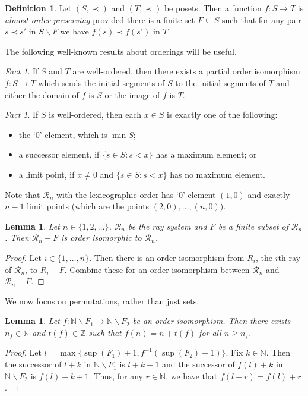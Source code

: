 \documentclass[11pt,a4paper]{amsart}
\renewcommand{\setminus}{\smallsetminus}
\newtheorem{lemma}[theorem]{Lemma}
\theoremstyle{definition}
\newtheorem{definition}[theorem]{Definition}
\theoremstyle{remark}
\newtheorem{fact}[theorem]{Fact}
\newcommand{\Z}{\mathbb Z}
\newcommand{\N}{\mathbb N}
\newcommand{\Ra}{\mathcal{R}}
\begin{document}
\begin{definition}
	Let $(S,\prec)$ and $(T,\prec)$ be posets. Then a function $f:S\to T$ is \emph{almost order preserving} provided there is a finite set $F\subseteq S$ such that for any pair $s\prec s'$ in $S\setminus F$ we have $f(s)\prec f(s')$ in $T$.
\end{definition}
The following well-known results about orderings will be useful.
\begin{fact}\label{orders1} If $S$ and $T$ are well-ordered, then there exists a partial order isomorphism $f: S\to T$ which sends the initial segments of $S$ to the initial segments of $T$ and either the domain of $f$ is $S$ or the image of $f$ is $T$.
\end{fact}
\begin{fact}\label{orders2} If $S$ is well-ordered, then each $x\in S$ is exactly one of the following:
\begin{itemize}
\item[(i)] the `0' element, which is $\min S$;
\item[(ii)] a successor element, if $\{s\in S : s<x\}$ has a maximum element; or
\item[(iii)] a limit point, if $x\ne0$ and $\{s\in S : s<x\}$ has no maximum element.
\end{itemize}
\end{fact}
Note that $\Ra_n$ with the lexicographic order has `0' element $(1, 0)$ and exactly $n-1$ limit points (which are the points $(2, 0), \ldots, (n, 0)$).
\begin{lemma}\label{lem:orderiso1}
	Let $n\in \{1, 2, \ldots\}$, $\Ra_n$ be the ray system and $F$ be a finite subset of $\Ra_n$. Then $\Ra_n-F$ is order isomorphic to $\Ra_n$. 
\end{lemma}
\begin{proof}
Let $i\in \{1,\ldots, n\}$. Then there is an order isomorphism from $R_i$, the $i$th ray of $\Ra_n$, to $R_i-F$. Combine these for an order isomorphism between $\Ra_n$ and $\Ra_n-F$.
\end{proof}
We now focus on permutations, rather than just sets.
\begin{lemma}\label{H1orderiso} Let $f: \N\setminus F_1\to \N\setminus F_2$ be an order isomorphism. Then there exists $n_f\in \N$ and $t(f)\in \Z$ such that $f(n)=n+t(f)$ for all $n\ge n_f$.
\end{lemma}
\begin{proof} Let $l=\max\{\sup(F_1)+1, f^{-1}(\sup(F_2)+1)\}$. Fix $k\in \N$. Then the successor of $l+k$ in $\N\setminus F_1$ is $l+k+1$ and the successor of $f(l)+k$ in $\N\setminus F_2$ is $f(l)+k+1$. Thus, for any $r\in \N$, we have that $f(l+r)=f(l)+r$.
\end{proof}
\end{document}

